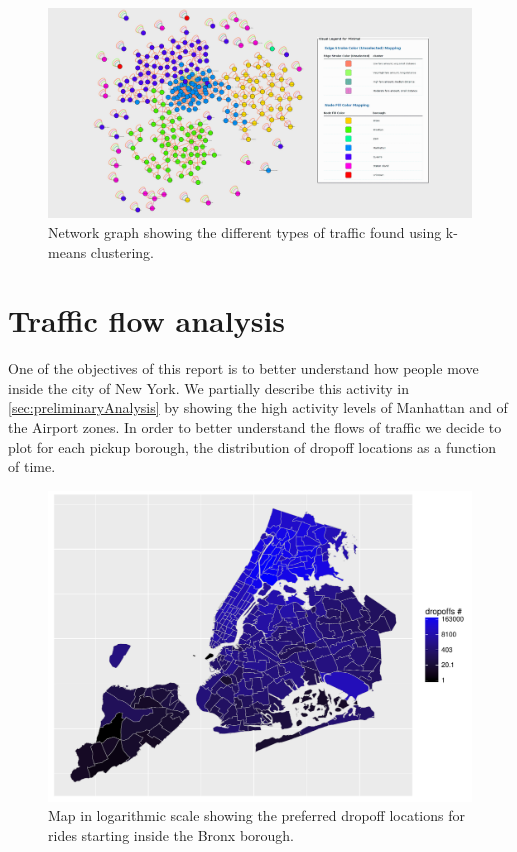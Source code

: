 \documentclass{acm_proc_article-sp-sigmod09}
\begin{document}
\begin{figure}
	\centering
	\includegraphics[width=1\columnwidth]{resources/traffic_graph_with_legend.png}
	\caption{Network graph showing the different types of traffic found using k-means clustering.}
	\label{fig:TrafficGraphWithLegend}
\end{figure}

\section{Traffic flow analysis}

One of the objectives of this report is to better understand how people move inside the city of New York. We partially describe this activity in \cref{sec:preliminaryAnalysis} by showing the high activity levels of Manhattan and of the Airport zones. In order to better understand the flows of traffic we decide to plot for each pickup borough, the distribution of dropoff locations as a function of time.

\begin{figure}
	\centering
	\includegraphics[width=1\columnwidth]{resources/base_plots/bronx_dropoff_location_id_dist_map.pdf}
	\caption{Map in logarithmic scale showing the preferred dropoff locations for rides starting inside the Bronx borough.}
	\label{fig:bronxDropoffMap}
\end{figure}
\end{document}
